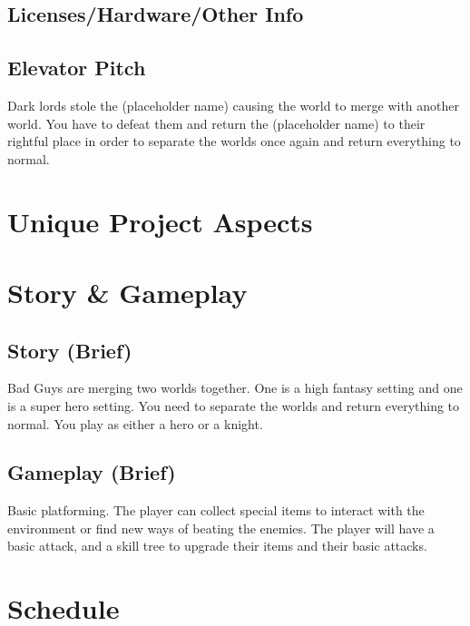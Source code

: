 \documentclass[titlepage]{article}
\begin{document}
\subsection*{Licenses/Hardware/Other Info}

\subsection*{Elevator Pitch}
Dark lords stole the (placeholder name) causing the world to merge with another world. You have to defeat them and return the (placeholder name) to their rightful place in order to separate the worlds once again and return everything to normal. 

\section{Unique Project Aspects}

\section{Story \& Gameplay}
\subsection*{Story (Brief)}
Bad Guys are merging two worlds together. One is a high fantasy setting and one is a super hero setting. You need to separate the worlds and return everything to normal. You play as either a hero or a knight. 

\subsection*{Gameplay (Brief)}
Basic platforming. The player can collect special items to interact with the environment or find new ways of beating the enemies. The player will have a basic attack, and a skill tree to upgrade their items and their basic attacks. 

\section{Schedule}

\end{document}
